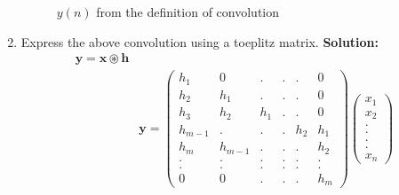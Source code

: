 \documentclass[journal,12pt,twocolumn]{IEEEtran}
\newcommand{\solution}{\noindent \textbf{Solution: }}
\let\vec\mathbf
\numberwithin{equation}{section}
\renewcommand\thesection{\arabic{section}}
\newcommand{\myvec}[1]{\ensuremath{\begin{pmatrix}#1\end{pmatrix}}}
\begin{document}
\begin{enumerate}[label=\thesection.\arabic*]
\begin{figure}[!ht]
\caption{$y(n)$ from the definition of convolution}
\label{fig:ynconv}
\end{figure}
\item Express the above convolution using a toeplitz matrix.
\solution
\begin{align}
\vec{y} = \vec{x} 
\circledast \vec{h}\\
& \vec{y} = \myvec{ h_1 & 0 & . & . & . & 0 \\ h_2 & h_1 & . & . & . & 0 \\ h_3 & h_2 & h_1 & . & . & 0 \\
 h_{m-1} & . & . & . & h_2 & h_1 \\ 
 h_m & h_{m-1} &. & . & . & h_2 \\ 
 . & . &. & . & . & . \\ 
 . & . & . & . & . & . \\
  0 & 0 & . & . & . & h_m } 
  \myvec{x_1 \\ x_2 \\ . \\ . \\ . \\ . \\ x_n}
\end{align}


\end{enumerate}
\end{document}
